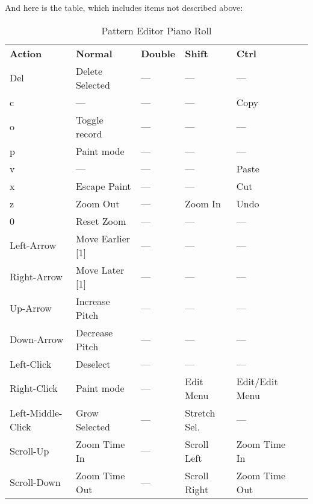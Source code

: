    And here is the table, which includes items not described above:

   \begin{table}[H]
      \centering
      \caption{Pattern Editor Piano Roll}
      \label{table:pattern_editor_piano_roll}
      \begin{tabular}{l l l l l l}
         \textbf{Action}   & \textbf{Normal} & \textbf{Double}    & \textbf{Shift} & \textbf{Ctrl}    \\
         Del               & Delete Selected & ---                & ---            & ---              \\
         c                 & ---             & ---                & ---            & Copy             \\
         o                 & Toggle record   & ---                & ---            & ---              \\
         p                 & Paint mode      & ---                & ---            & ---              \\
         v                 & ---             & ---                & ---            & Paste            \\
         x                 & Escape Paint    & ---                & ---            & Cut              \\
         z                 & Zoom Out        & ---                & Zoom In        & Undo             \\
         0                 & Reset Zoom      & ---                & ---            & ---              \\
         Left-Arrow        & Move Earlier [1] & ---               & ---            & ---              \\
         Right-Arrow       & Move Later [1]  & ---                & ---            & ---              \\
         Up-Arrow          & Increase Pitch  & ---                & ---            & ---              \\
         Down-Arrow        & Decrease Pitch  & ---                & ---            & ---              \\
         Left-Click        & Deselect        & ---                & ---            & ---              \\
         Right-Click       & Paint mode      & ---                & Edit Menu      & Edit/Edit Menu   \\
         Left-Middle-Click & Grow Selected   & ---                & Stretch Sel.   & ---              \\
         Scroll-Up         & Zoom Time In    & ---                & Scroll Left    & Zoom Time In     \\
         Scroll-Down       & Zoom Time Out   & ---                & Scroll Right   & Zoom Time Out    \\
      \end{tabular}
   \end{table}

